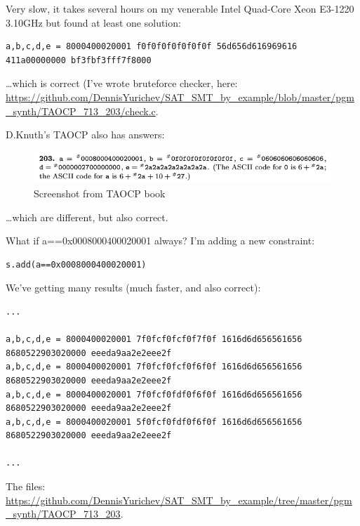 

Very slow, it takes several hours on my venerable Intel Quad-Core Xeon E3-1220 3.10GHz but found at least one solution:

\begin{lstlisting}
a,b,c,d,e = 8000400020001 f0f0f0f0f0f0f0f 56d656d616969616 411a00000000 bf3fbf3fff7f8000
\end{lstlisting}

\dots which is correct (I've wrote bruteforce checker, here: \url{https://github.com/DennisYurichev/SAT_SMT_by_example/blob/master/pgm_synth/TAOCP_713_203/check.c}.

D.Knuth's TAOCP also has answers:

\begin{figure}[H]
\centering
\includegraphics[scale=0.6]{pgm_synth/TAOCP_713_203/203a.png}
\caption{Screenshot from TAOCP book}
\end{figure}

\dots which are different, but also correct.

What if a==0x0008000400020001 always?
I'm adding a new constraint:

\begin{lstlisting}
s.add(a==0x0008000400020001)
\end{lstlisting}

We've getting many results (much faster, and also correct):

\begin{lstlisting}
...

a,b,c,d,e = 8000400020001 7f0fcf0fcf0f7f0f 1616d6d656561656 8680522903020000 eeeda9aa2e2eee2f
a,b,c,d,e = 8000400020001 7f0fcf0fcf0f6f0f 1616d6d656561656 8680522903020000 eeeda9aa2e2eee2f
a,b,c,d,e = 8000400020001 7f0fcf0fdf0f6f0f 1616d6d656561656 8680522903020000 eeeda9aa2e2eee2f
a,b,c,d,e = 8000400020001 5f0fcf0fdf0f6f0f 1616d6d656561656 8680522903020000 eeeda9aa2e2eee2f

...
\end{lstlisting}

The files: \url{https://github.com/DennisYurichev/SAT_SMT_by_example/tree/master/pgm_synth/TAOCP_713_203}.

